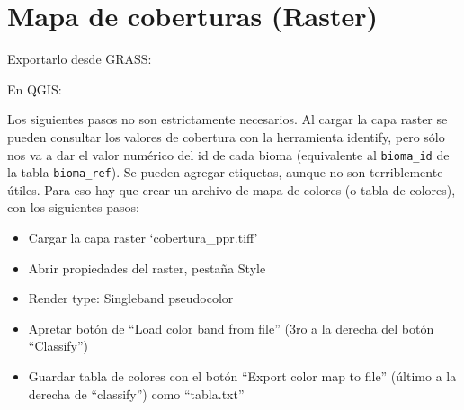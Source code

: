 \documentclass[spanish,]{article}
\newenvironment{Shaded}{}{}
\newcommand{\KeywordTok}[1]{\textcolor[rgb]{0.00,0.44,0.13}{\textbf{{#1}}}}
\newcommand{\StringTok}[1]{\textcolor[rgb]{0.25,0.44,0.63}{{#1}}}
\newcommand{\CommentTok}[1]{\textcolor[rgb]{0.38,0.63,0.69}{\textit{{#1}}}}
\newcommand{\OtherTok}[1]{\textcolor[rgb]{0.00,0.44,0.13}{{#1}}}
\newcommand{\NormalTok}[1]{{#1}}
\providecommand{\tightlist}{%
  \setlength{\itemsep}{0pt}\setlength{\parskip}{0pt}}
\begin{document}
\section{Mapa de coberturas (Raster)}\label{mapa-de-coberturas-raster}

Exportarlo desde GRASS:

\begin{Shaded}
\end{Shaded}

En QGIS:

Los siguientes pasos no son estrictamente necesarios. Al cargar la capa
raster se pueden consultar los valores de cobertura con la herramienta
identify, pero sólo nos va a dar el valor numérico del id de cada bioma
(equivalente al \texttt{bioma\_id} de la tabla \texttt{bioma\_ref}). Se
pueden agregar etiquetas, aunque no son terriblemente útiles. Para eso
hay que crear un archivo de mapa de colores (o tabla de colores), con
los siguientes pasos:

\begin{itemize}
\tightlist
\item
  Cargar la capa raster `cobertura\_ppr.tiff'
\item
  Abrir propiedades del raster, pestaña Style
\item
  Render type: Singleband pseudocolor
\item
  Apretar botón de ``Load color band from file'' (3ro a la derecha del
  botón ``Classify'')
\item
  Guardar tabla de colores con el botón ``Export color map to file''
  (último a la derecha de ``classify'') como ``tabla.txt''
\end{itemize}
\end{document}
